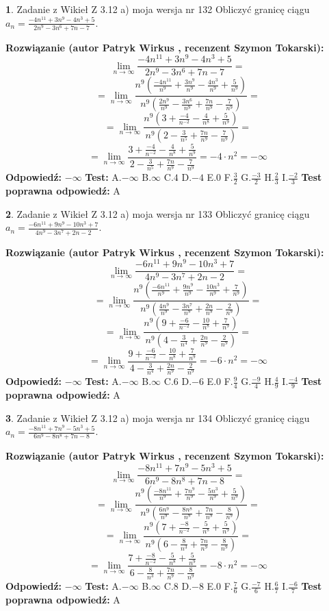 \documentclass[12pt, a4paper]{article}
\theoremstyle{definition} %
\newtheorem{zad}{}
\newcommand{\zadStart}[1]{\begin{zad}#1\newline}
\newcommand{\zadStop}{\end{zad}}
\newcommand{\rozwStart}[2]{\noindent \textbf{Rozwiązanie (autor #1 , recenzent #2): }\newline}
\newcommand{\rozwStop}{\newline}
\newcommand{\odpStart}{\noindent \textbf{Odpowiedź:}\newline}
\newcommand{\odpStop}{\newline}
\newcommand{\testStart}{\noindent \textbf{Test:}\newline}
\newcommand{\testStop}{\newline}
\newcommand{\kluczStart}{\noindent \textbf{Test poprawna odpowiedź:}\newline}
\newcommand{\kluczStop}{\newline}
\begin{document}
\zadStart{Zadanie z Wikieł Z 3.12 a) moja wersja nr 132}
Obliczyć granicę ciągu $a_{n}=\frac{-4n^{11}+3n^{9}-4n^{3}+5}{2n^{9}-3n^{6}+7n-7}$.
\zadStop
\rozwStart{Patryk Wirkus}{Szymon Tokarski}
$$\lim\limits_{n\to\infty}\frac{-4n^{11}+3n^{9}-4n^{3}+5}{2n^{9}-3n^{6}+7n-7}=$$
$$=\lim\limits_{n\to\infty}\frac{n^{9}\left(\frac{-4n^{11}}{n^{9}}+\frac{3n^{9}}{n^{9}}-\frac{4n^{3}}{n^{9}}+\frac{5}{n^{9}}\right)}{n^{9}\left(\frac{2n^{9}}{n^{9}}-\frac{3n^{6}}{n^{9}}+\frac{7n}{n^{9}}-\frac{7}{n^{9}}\right)}=$$
$$=\lim\limits_{n\to\infty}\frac{n^{9}\left(3+\frac{-4}{n^{-2}}-\frac{4}{n^{8}}+\frac{5}{n^{9}}\right)}
{n^{9}\left(2-\frac{3}{n^{5}}+\frac{7n}{n^{9}}-\frac{7}{n^{9}}\right)}=$$
$$=\lim\limits_{n\to\infty}\frac{3+\frac{-4}{n^{-2}}-\frac{4}{n^{8}}+\frac{5}{n^{9}}}{2-\frac{3}{n^{5}}+\frac{7n}{n^{9}}-\frac{7}{n^{9}}}=-4\cdot n^{2} = -\infty$$
\rozwStop
\odpStart
$-\infty$
\odpStop
\testStart
A.$-\infty$
B.$\infty$
C.$4$
D.$-4$
E.$0$
F.$\frac{3}{2}$
G.$\frac{-3}{2}$
H.$\frac{2}{3}$
I.$\frac{-2}{3}$
\testStop
\kluczStart
A
\kluczStop



\zadStart{Zadanie z Wikieł Z 3.12 a) moja wersja nr 133}
Obliczyć granicę ciągu $a_{n}=\frac{-6n^{11}+9n^{9}-10n^{3}+7}{4n^{9}-3n^{7}+2n-2}$.
\zadStop
\rozwStart{Patryk Wirkus}{Szymon Tokarski}
$$\lim\limits_{n\to\infty}\frac{-6n^{11}+9n^{9}-10n^{3}+7}{4n^{9}-3n^{7}+2n-2}=$$
$$=\lim\limits_{n\to\infty}\frac{n^{9}\left(\frac{-6n^{11}}{n^{9}}+\frac{9n^{9}}{n^{9}}-\frac{10n^{3}}{n^{9}}+\frac{7}{n^{9}}\right)}{n^{9}\left(\frac{4n^{9}}{n^{9}}-\frac{3n^{7}}{n^{9}}+\frac{2n}{n^{9}}-\frac{2}{n^{9}}\right)}=$$
$$=\lim\limits_{n\to\infty}\frac{n^{9}\left(9+\frac{-6}{n^{-2}}-\frac{10}{n^{8}}+\frac{7}{n^{9}}\right)}
{n^{9}\left(4-\frac{3}{n^{4}}+\frac{2n}{n^{9}}-\frac{2}{n^{9}}\right)}=$$
$$=\lim\limits_{n\to\infty}\frac{9+\frac{-6}{n^{-2}}-\frac{10}{n^{8}}+\frac{7}{n^{9}}}{4-\frac{3}{n^{4}}+\frac{2n}{n^{9}}-\frac{2}{n^{9}}}=-6\cdot n^{2} = -\infty$$
\rozwStop
\odpStart
$-\infty$
\odpStop
\testStart
A.$-\infty$
B.$\infty$
C.$6$
D.$-6$
E.$0$
F.$\frac{9}{4}$
G.$\frac{-9}{4}$
H.$\frac{4}{9}$
I.$\frac{-4}{9}$
\testStop
\kluczStart
A
\kluczStop



\zadStart{Zadanie z Wikieł Z 3.12 a) moja wersja nr 134}
Obliczyć granicę ciągu $a_{n}=\frac{-8n^{11}+7n^{9}-5n^{3}+5}{6n^{9}-8n^{8}+7n-8}$.
\zadStop
\rozwStart{Patryk Wirkus}{Szymon Tokarski}
$$\lim\limits_{n\to\infty}\frac{-8n^{11}+7n^{9}-5n^{3}+5}{6n^{9}-8n^{8}+7n-8}=$$
$$=\lim\limits_{n\to\infty}\frac{n^{9}\left(\frac{-8n^{11}}{n^{9}}+\frac{7n^{9}}{n^{9}}-\frac{5n^{3}}{n^{9}}+\frac{5}{n^{9}}\right)}{n^{9}\left(\frac{6n^{9}}{n^{9}}-\frac{8n^{8}}{n^{9}}+\frac{7n}{n^{9}}-\frac{8}{n^{9}}\right)}=$$
$$=\lim\limits_{n\to\infty}\frac{n^{9}\left(7+\frac{-8}{n^{-2}}-\frac{5}{n^{8}}+\frac{5}{n^{9}}\right)}
{n^{9}\left(6-\frac{8}{n^{3}}+\frac{7n}{n^{9}}-\frac{8}{n^{9}}\right)}=$$
$$=\lim\limits_{n\to\infty}\frac{7+\frac{-8}{n^{-2}}-\frac{5}{n^{8}}+\frac{5}{n^{9}}}{6-\frac{8}{n^{3}}+\frac{7n}{n^{9}}-\frac{8}{n^{9}}}=-8\cdot n^{2} = -\infty$$
\rozwStop
\odpStart
$-\infty$
\odpStop
\testStart
A.$-\infty$
B.$\infty$
C.$8$
D.$-8$
E.$0$
F.$\frac{7}{6}$
G.$\frac{-7}{6}$
H.$\frac{6}{7}$
I.$\frac{-6}{7}$
\testStop
\kluczStart
A
\kluczStop
\end{document}
